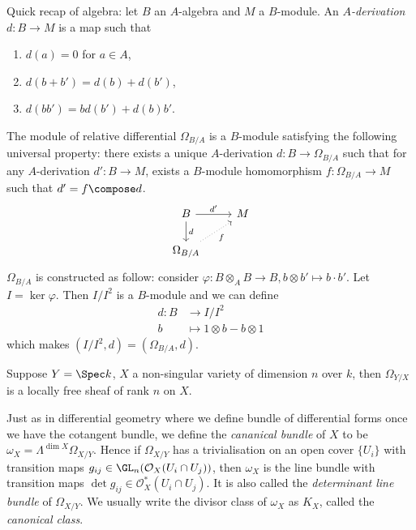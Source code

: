 \documentclass[a4paper]{article}
\newcommand{\sh}[1]{\mathcal{#1}} %
\begin{document}
Quick recap of algebra: let \(B\) an \(A\)-algebra and \(M\) a \(B\)-module. An \emph{\(A\)-derivation} \(d: B \to M\) is a map such that
\begin{enumerate}
\item \(d(a) = 0\) for \(a \in A\),
\item \(d(b + b') = d(b) + d(b')\),
\item \(d(bb') = b d(b') + d(b) b'\).
\end{enumerate}
The module of relative differential \(\Omega_{B/A}\) is a \(B\)-module satisfying the following universal property: there exists a unique \(A\)-derivation \(d: B \to \Omega_{B/A}\) such that for any \(A\)-derivation \(d': B \to M\), exists a \(B\)-module homomorphism \(f: \Omega_{B/A} \to M\) such that \(d' = f \compose d\).
\[
  \begin{tikzcd}
    B \ar[r, "d'"] \ar[d, "d"] & M \\
    \Omega_{B/A} \ar[ur, dotted, "f"']
  \end{tikzcd}
\]
\(\Omega_{B/A}\) is constructed as follow: consider \(\varphi: B \otimes_A B \to B, b \otimes b' \mapsto b \cdot b'\). Let \(I = \ker \varphi\). Then \(I/I^2\) is a \(B\)-module and we can define
\begin{align*}
  d: B &\to I/I^2 \\
  b &\mapsto 1 \otimes b - b \otimes 1
\end{align*}
which makes \((I/I^2, d) = (\Omega_{B/A}, d)\).

\begin{eg}
  Suppose \(Y = \Spec k\), \(X\) a non-singular variety of dimension \(n\) over \(k\), then \(\Omega_{Y/X}\) is a locally free sheaf of rank \(n\) on \(X\).
\end{eg}

Just as in differential geometry where we define bundle of differential forms once we have the cotangent bundle, we define the \emph{cananical bundle} of \(X\) to be \(\omega_X = \Lambda^{\dim X} \Omega_{X/Y}\). Hence if \(\Omega_{X/Y}\) has a trivialisation on an open cover \(\{U_i\}\) with transition maps \(g_{ij} \in \GL_n(\sh O_X(U_i \cap U_j))\), then \(\omega_X\) is the line bundle with transition maps \(\det g_{ij} \in \sh O_X^*(U_i \cap U_j)\). It is also called the \emph{determinant line bundle} of \(\Omega_{X/Y}\). We usually write the divisor class of \(\omega_X\) as \(K_X\), called the \emph{canonical class}.
\end{document}
